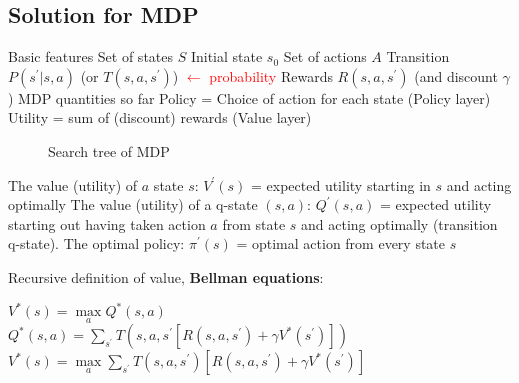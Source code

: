 \subsection{Solution for MDP}
\begin{outline}
    \1 Basic features
        \2 Set of states $S$
        \2 Initial state $s_{0}$
        \2 Set of actions $A$
        \2 Transition $P(s^{\prime}|s,a)$ (or $T(s,a,s^{\prime})$) \textcolor{red}{$\leftarrow$ probability}
        \2 Rewards $R(s,a,s^{\prime})$ (and discount $\gamma$)
    \1 MDP quantities so far
        \2 Policy = Choice of action for each state (Policy layer)
        \2 Utility = sum of (discount) rewards (Value layer)
\end{outline}

\begin{figure}[htbp]
    \centering
    \caption{Search tree of MDP}
    \label{fig:MDP_s_q_t_search_tree}
\end{figure}

\noindent
\begin{outline}
    \1 The value (utility) of $a$ state $s$:
        \2 $V^{\prime}(s)$ = expected utility starting in $s$ and acting optimally
    \1 The value (utility) of a q-state $(s,a)$:
        \2 $Q^{\prime}(s,a)$ = expected utility starting out having taken action $a$ from state $s$ and acting optimally (transition q-state).
    \1 The optimal policy:
        \2 $\pi^{\prime}(s)$ = optimal action from every state $s$
\end{outline}

\noindent
Recursive definition of value, \textbf{Bellman equations}:
\begin{outline}
    \1 $V^{*}(s) = \max\limits_a Q^{*}(s,a)$
    \1 $Q^{*}(s,a) = \sum_{s^{\prime}} T(s,a,s^{\prime}[R(s,a,s^{\prime}) + \gamma V^{*}(s^{\prime})])$
    \1 $V^{*}(s) = \max\limits_a \sum_{s^{\prime}} T(s,a,s^{\prime}) [R(s,a,s^{\prime}) + \gamma V^{*}(s^{\prime})]$
\end{outline}

